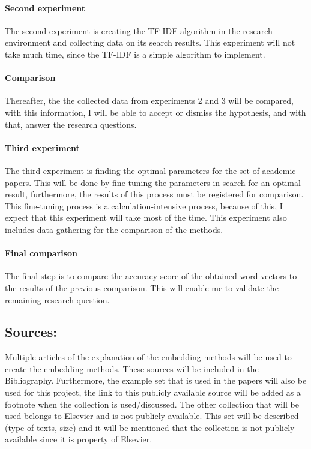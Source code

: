 \documentclass[10pt,a4paper]{article}
\begin{document}
\paragraph{Second experiment}The second experiment is creating the TF-IDF algorithm in the research environment and collecting data on its search results. This experiment will not take much time, since the TF-IDF is a simple algorithm to implement.\\
\paragraph{Comparison}
Thereafter, the the collected data from experiments 2 and 3 will be compared, with this information, I will be able to accept or dismiss the hypothesis, and with that, answer the research questions.\\
\paragraph{Third experiment}The third experiment is finding the optimal parameters for the set of academic papers. This will be done by fine-tuning the parameters in search for an optimal result, furthermore, the results of this process must be registered for comparison. This fine-tuning process is a calculation-intensive process, because of this, I expect that this experiment will take most of the time. This experiment also includes data gathering for the comparison of the methods.\\
\paragraph{Final comparison}
The final step is to compare the accuracy score of the obtained word-vectors to the results of the previous comparison. This will enable me to validate the remaining research question.

\subsection{Sources:}
Multiple articles of the explanation of the embedding methods will be used to create the embedding methods. These sources will be included in the Bibliography. Furthermore, the example set that is used in the papers will also be used for this project, the link to this publicly available source will be added as a footnote when the collection is used/discussed. The other collection that will be used belongs to Elsevier and is not publicly available. This set will be described (type of texts, size) and it will be mentioned that the collection is not publicly available since it is property of Elsevier. 
\end{document}
